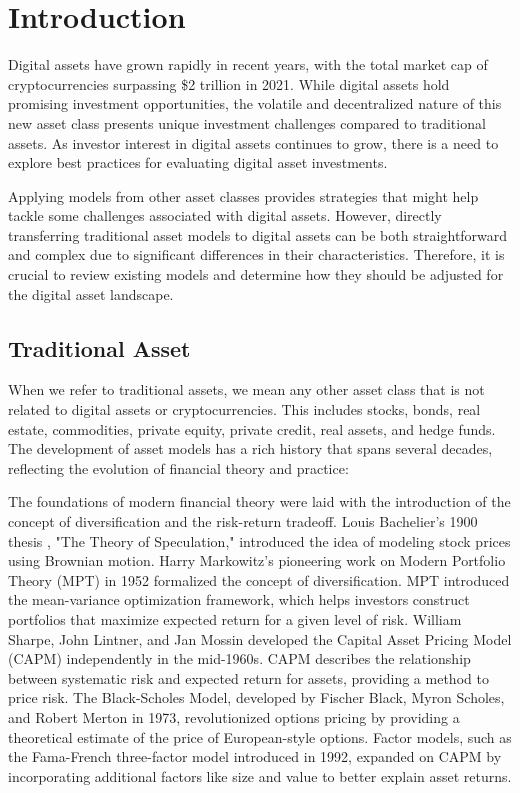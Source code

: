 \section{Introduction}
Digital assets have grown rapidly in recent years, with the total market cap of cryptocurrencies surpassing \$2 trillion in 2021\cite{CNBCCryptoMarketCap}. While digital assets hold promising investment opportunities, the volatile and decentralized nature of this new asset class presents unique investment challenges compared to traditional assets. As investor interest in digital assets continues to grow, there is a need to explore best practices for evaluating digital asset investments.

Applying models from other asset classes provides strategies that might help tackle some challenges associated with digital assets. However, directly transferring traditional asset models to digital assets can be both straightforward and complex due to significant differences in their characteristics. Therefore, it is crucial to review existing models and determine how they should be adjusted for the digital asset landscape.


\subsection{Traditional Asset}
When we refer to traditional assets, we mean any other asset class that is not related to digital assets or cryptocurrencies. This includes stocks, bonds, real estate, commodities, private equity, private credit, real assets, and hedge funds. The development of asset models has a rich history that spans several decades, reflecting the evolution of financial theory and practice:

The foundations of modern financial theory were laid with the introduction of the concept of diversification and the risk-return tradeoff. Louis Bachelier's 1900 thesis \cite{Bachelier1900}, "The Theory of Speculation," introduced the idea of modeling stock prices using Brownian motion. Harry Markowitz's pioneering work on Modern Portfolio Theory (MPT)\cite{Markowitz1952} in 1952 formalized the concept of diversification. MPT introduced the mean-variance optimization framework, which helps investors construct portfolios that maximize expected return for a given level of risk. William Sharpe, John Lintner, and Jan Mossin developed the Capital Asset Pricing Model (CAPM)\cite{Perold2004} independently in the mid-1960s. CAPM describes the relationship between systematic risk and expected return for assets, providing a method to price risk. The Black-Scholes Model\cite{BlackScholes1973}, developed by Fischer Black, Myron Scholes, and Robert Merton in 1973, revolutionized options pricing by providing a theoretical estimate of the price of European-style options. Factor models, such as the Fama-French three-factor model\cite{FamaFrench1992} introduced in 1992, expanded on CAPM by incorporating additional factors like size and value to better explain asset returns.

